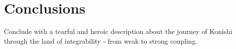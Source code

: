 
\section{Conclusions}

Conclude with a tearful and heroic description about the journey of Konishi through the land of integrability - from weak to strong coupling.
